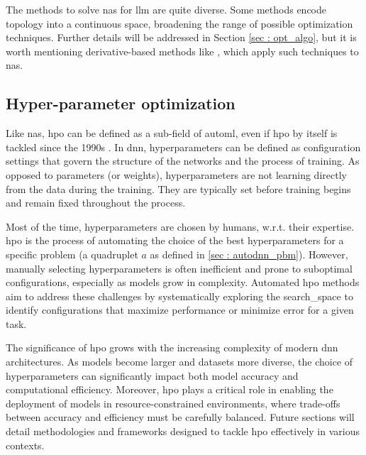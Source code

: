 The methods to solve \acrshort{nas} for \acrshort{llm} are quite diverse. Some methods encode topology into a continuous space, broadening the range of possible optimization techniques. Further details will be addressed in Section \ref{sec : opt_algo}, but it is worth mentioning derivative-based methods like \cite{liu_darts_2019}, which apply such techniques to \acrshort{nas}.

\subsection{Hyper-parameter optimization}
\label{sec : hpo}
Like \acrshort{nas}, \acrshort{hpo} can be defined as a sub-field of \acrshort{automl}, even if \acrshort{hpo} by itself is tackled since the 1990s \cite{feurer_hyperparameter_2019}. In \acrfull{dnn}, \glspl{hyperparameter} can be defined as configuration settings that govern the structure of the networks and the process of training. As opposed to parameters (or weights), \glspl{hyperparameter} are not learning directly from the data during the training. They are typically set before training begins and remain fixed throughout the process.

Most of the time, \glspl{hyperparameter} are chosen by humans, w.r.t. their expertise. \acrshort{hpo} is the process of automating the choice of the best \glspl{hyperparameter} for a specific problem (a quadruplet $a$ as defined in \ref{sec : autodnn_pbm}). However, manually selecting \glspl{hyperparameter} is often inefficient and prone to suboptimal configurations, especially as models grow in complexity. Automated \acrshort{hpo} methods aim to address these challenges by systematically exploring the \gls{search_space} to identify configurations that maximize performance or minimize error for a given task.

The significance of \acrshort{hpo} grows with the increasing complexity of modern \acrshort{dnn} architectures. As models become larger and datasets more diverse, the choice of \glspl{hyperparameter} can significantly impact both model accuracy and computational efficiency. Moreover, \acrshort{hpo} plays a critical role in enabling the deployment of models in resource-constrained environments, where trade-offs between accuracy and efficiency must be carefully balanced. Future sections will detail methodologies and frameworks designed to tackle \acrshort{hpo} effectively in various contexts.



